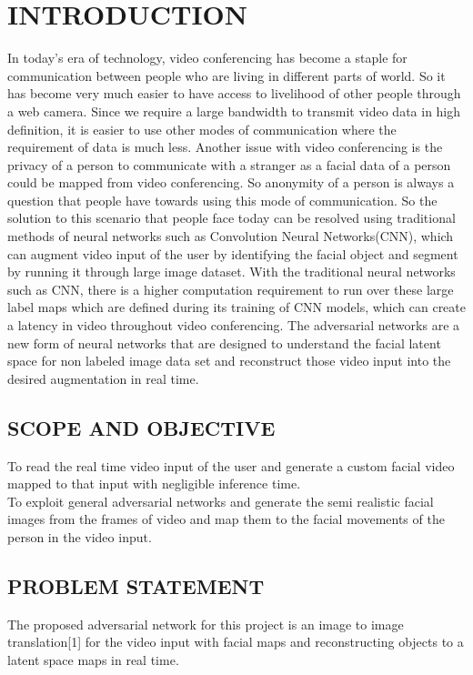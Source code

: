 \documentclass[12pt, a4paper]{report}
\begin{document}
\chapter{INTRODUCTION}
\justify \large{In today's era of technology, video conferencing has become a staple for communication between people who are living in different parts of world. So it has become very much easier to have access to livelihood of other people through a web camera. Since we require a large bandwidth to transmit video data in high definition, it is easier to use other modes of communication where the requirement of data is much less. Another issue with video conferencing is the privacy of a person to communicate with a stranger as a facial data of a person could be mapped from video conferencing. So anonymity of a person is always a question that people have towards using this mode of communication. So the solution to this scenario that people face today can be resolved using traditional methods of neural networks such as Convolution Neural Networks(CNN), which can augment video input of the user by identifying the facial object and segment by running it through large image dataset. 
With the traditional neural networks such as CNN, there is a higher computation requirement to run over these large label maps which are defined during its training of CNN models, which can create a latency in video throughout video conferencing. The adversarial networks are a new form of neural networks that are designed to understand the facial latent space  for non labeled image data set and reconstruct those video input into the desired augmentation in real time.}
\section{SCOPE AND OBJECTIVE}
\justify \large{ To read the real time video input of the user and generate a custom facial video mapped to that input with negligible inference time.\\
   To exploit general adversarial networks and generate the semi realistic facial images from the frames of video and map them to the facial movements of the person in the video input.}
\section{ PROBLEM STATEMENT}
\justify \large{The proposed adversarial network for this project is an image to image translation[1] for the video input with facial maps and reconstructing objects to a latent space maps in real time.
  }
\end{document}

